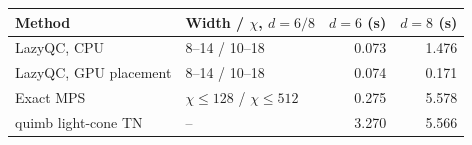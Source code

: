 \begin{tabular}{llrr}
\toprule
Method & Width / $\chi$, $d=6/8$ & $d=6$ (s) & $d=8$ (s)\\
\midrule
LazyQC, CPU & 8--14 / 10--18 & 0.073 & 1.476\\
LazyQC, GPU placement & 8--14 / 10--18 & 0.074 & 0.171\\
Exact MPS & $\chi\leq128$ / $\chi\leq512$ & 0.275 & 5.578\\
quimb light-cone TN & -- & 3.270 & 5.566\\
\bottomrule
\end{tabular}
